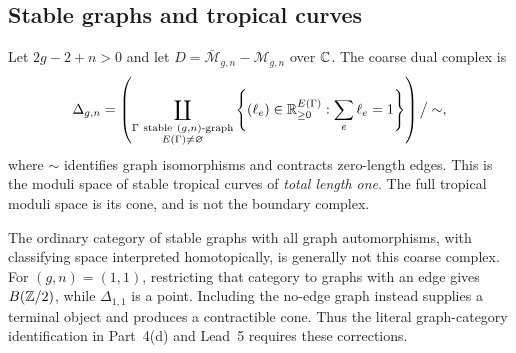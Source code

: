 \subsection{Stable graphs and tropical curves}

\begin{theorem}
\label{P4d1}
Let $2g-2+n>0$ and let $D=\overline{\mathcal M}_{g,n}-\mathcal M_{g,n}$ over $\mathbb C$.  The coarse dual complex is
\[
 \Delta_{g,n}=
 \left(\coprod_{\substack{\Gamma\ \mathrm{stable}\ (g,n)\text{-graph}\\E(\Gamma)\ne\varnothing}}
 \left\{(\ell_e)\in\R_{\ge0}^{E(\Gamma)}:\sum_e\ell_e=1\right\}\right)\big/\sim,
\]
where $\sim$ identifies graph isomorphisms and contracts zero-length edges.  This is the moduli space of stable tropical curves of \emph{total length one}.  The full tropical moduli space is its cone, and is not the boundary complex.

The ordinary category of stable graphs with all graph automorphisms, with classifying space interpreted homotopically, is generally not this coarse complex.  For $(g,n)=(1,1)$, restricting that category to graphs with an edge gives $B(\mathbb Z/2)$, while $\Delta_{1,1}$ is a point.  Including the no-edge graph instead supplies a terminal object and produces a contractible cone.  Thus the literal graph-category identification in Part~4(d) and Lead~5 requires these corrections.
\end{theorem}
